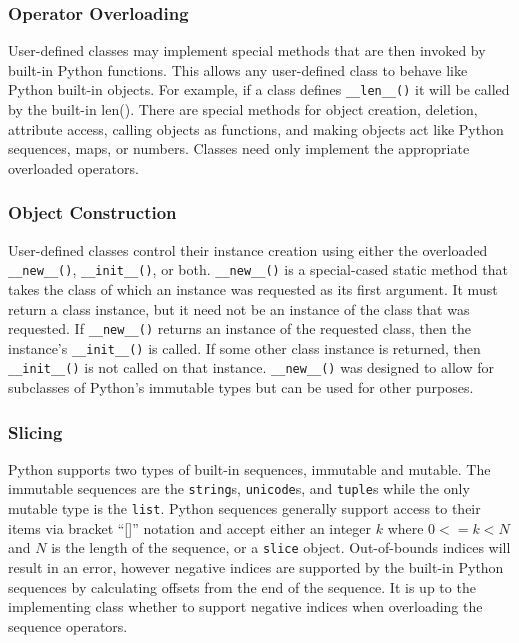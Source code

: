 \documentclass[preprint]{sigplanconf}
\begin{document}
\subsubsection{Operator Overloading}

User-defined classes may implement special methods that are then invoked by
built-in Python functions. This allows any user-defined class to behave like
Python built-in objects. For example, if a class defines \verb=__len__()= it
will be called by the built-in len(). There are special methods for object
creation, deletion, attribute access, calling objects as functions, and making
objects act like Python sequences, maps, or numbers. Classes need only
implement the appropriate overloaded operators.

\subsubsection{Object Construction}

User-defined classes control their instance creation using either the
overloaded \verb=__new__()=, \verb=__init__()=, or both. \verb=__new__()= is a
special-cased static method that takes the class of which an instance was
requested as its first argument. It must return a class instance, but it need
not be an instance of the class that was requested. If \verb=__new__()=
returns an instance of the requested class, then the instance’s
\verb=__init__()= is called. If some other class instance is returned, then
\verb=__init__()= is not called on that instance.  \verb=__new__()= was
designed to allow for subclasses of Python’s immutable types but can be used
for other purposes.

\subsubsection{Slicing}

Python supports two types of built-in sequences, immutable and mutable. The
immutable sequences are the \texttt{string}s, \texttt{unicode}s, and
\texttt{tuple}s while the only mutable type is the \texttt{list}. Python
sequences generally support access to their items via bracket “[]” notation
and accept either an integer $k$ where $0 <= k < N$ and $N$ is the length of
the sequence, or a \texttt{slice} object. Out-of-bounds indices will result in
an error, however negative indices are supported by the built-in Python
sequences by calculating offsets from the end of the sequence.  It is up to
the implementing class whether to support negative indices when overloading
the sequence operators.
\end{document}
